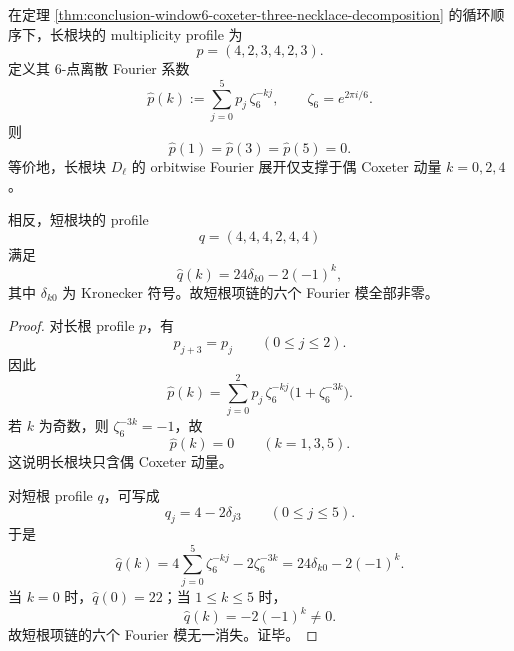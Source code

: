 \begin{theorem}\label{thm:conclusion-window6-long-root-fourier-selection-rule}
在定理 \ref{thm:conclusion-window6-coxeter-three-necklace-decomposition} 的循环顺序下，长根块的 multiplicity profile 为
\[
p=(4,2,3,4,2,3).
\]
定义其 \(6\)-点离散 Fourier 系数
\[
\widehat p(k):=\sum_{j=0}^{5}p_j\,\zeta_6^{-kj},
\qquad
\zeta_6=e^{2\pi i/6}.
\]
则
\[
\widehat p(1)=\widehat p(3)=\widehat p(5)=0.
\]
等价地，长根块 \(D_{\ell}\) 的 orbitwise Fourier 展开仅支撑于偶 Coxeter 动量 \(k=0,2,4\)。

相反，短根块的 profile
\[
q=(4,4,4,2,4,4)
\]
满足
\[
\widehat q(k)=24\delta_{k0}-2(-1)^k,
\]
其中 \(\delta_{k0}\) 为 Kronecker 符号。故短根项链的六个 Fourier 模全部非零。
\end{theorem}
\begin{proof}
对长根 profile \(p\)，有
\[
p_{j+3}=p_j\qquad (0\le j\le 2).
\]
因此
\[
\widehat p(k)
=
\sum_{j=0}^{2}p_j\,\zeta_6^{-kj}\bigl(1+\zeta_6^{-3k}\bigr).
\]
若 \(k\) 为奇数，则 \(\zeta_6^{-3k}=-1\)，故
\[
\widehat p(k)=0
\qquad (k=1,3,5).
\]
这说明长根块只含偶 Coxeter 动量。

对短根 profile \(q\)，可写成
\[
q_j=4-2\delta_{j3}
\qquad (0\le j\le 5).
\]
于是
\[
\widehat q(k)
=
4\sum_{j=0}^{5}\zeta_6^{-kj}-2\zeta_6^{-3k}
=
24\delta_{k0}-2(-1)^k.
\]
当 \(k=0\) 时，\(\widehat q(0)=22\)；当 \(1\le k\le 5\) 时，
\[
\widehat q(k)=-2(-1)^k\neq 0.
\]
故短根项链的六个 Fourier 模无一消失。证毕。
\end{proof}


